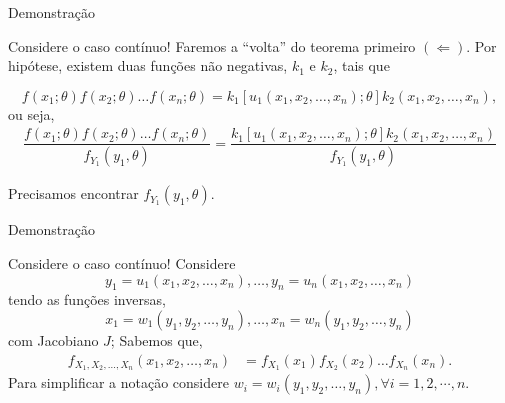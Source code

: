 \documentclass[12pt]{beamer}
\begin{document}
\begin{frame}{Demonstração}
	\begin{block}{Considere o caso contínuo!}
		\justifying
		Faremos a ``volta'' do teorema primeiro $(\Leftarrow{})$. Por hipótese, existem duas funções não negativas, $k_1$ e $k_2$, tais que
		
		\begin{equation*}
			f(x_1; \theta)f(x_2; \theta) \ldots f(x_n; \theta) = k_1[u_1(x_1, x_2, \ldots, x_n); \theta]k_2(x_1, x_2, \ldots, x_n),
		\end{equation*}
		ou seja, 
		\begin{align*}
			\dfrac{f(x_1; \theta)f(x_2; \theta) \ldots f(x_n; \theta)}{f_{Y_{1}}(y_{1},\theta)}=\dfrac{k_1[u_1(x_1, x_2, \ldots, x_n); \theta]k_2(x_1, x_2, \ldots, x_n)}{f_{Y_{1}}(y_{1},\theta)}
		\end{align*}
	\end{block}
	\pause
	\begin{block}{}
		Precisamos encontrar $f_{Y_{1}}(y_{1},\theta).$
	\end{block}
\end{frame}

\begin{frame}{Demonstração}
\begin{block}{Considere o caso contínuo!}
\justifying
Considere $$y_1 = u_1(x_1, x_2, \ldots, x_n), \ldots, y_n = u_n(x_1, x_2, \ldots, x_n)$$ tendo as funções inversas, $$x_1 = w_1(y_1, y_2, \ldots, y_n), \ldots, x_n = w_n(y_1, y_2, \ldots, y_n)$$ com Jacobiano $J$; Sabemos que, 
\begin{align*}
    f_{X_{1}, X_{2}, \ldots, X_{n}}(x_{1}, x_{2}, \ldots, x_{n})&=f_{X_{1}}(x_{1})f_{X_{2}}(x_{2})\ldots f_{X_{n}}(x_{n}).
\end{align*}
Para simplificar a notação considere $w_{i}=w_{i}(y_1, y_2, \ldots, y_n),\forall i=1,2,\cdots,n.$ 

\end{block}
\end{frame}
\end{document}
